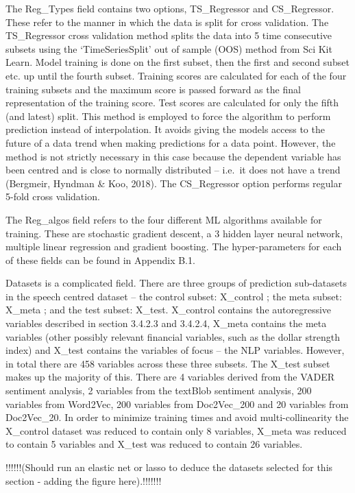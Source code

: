 \documentclass[11pt,preprint, authoryear]{elsarticle}
\numberwithin{equation}{section}
\numberwithin{figure}{section}
\numberwithin{table}{section}
\begin{document}
The Reg\_Types field contains two options, TS\_Regressor and
CS\_Regressor. These refer to the manner in which the data is split for
cross validation. The TS\_Regressor cross validation method splits the
data into 5 time consecutive subsets using the `TimeSeriesSplit' out of
sample (OOS) method from Sci Kit Learn. Model training is done on the
first subset, then the first and second subset etc. up until the fourth
subset. Training scores are calculated for each of the four training
subsets and the maximum score is passed forward as the final
representation of the training score. Test scores are calculated for
only the fifth (and latest) split. This method is employed to force the
algorithm to perform prediction instead of interpolation. It avoids
giving the models access to the future of a data trend when making
predictions for a data point. However, the method is not strictly
necessary in this case because the dependent variable has been centred
and is close to normally distributed -- i.e.~it does not have a trend
(Bergmeir, Hyndman \& Koo, 2018). The CS\_Regressor option performs
regular 5-fold cross validation.

The Reg\_algos field refers to the four different ML algorithms
available for training. These are stochastic gradient descent, a 3
hidden layer neural network, multiple linear regression and gradient
boosting. The hyper-parameters for each of these fields can be found in
Appendix B.1.

Datasets is a complicated field. There are three groups of prediction
sub-datasets in the speech centred dataset -- the control subset:
X\_control ; the meta subset: X\_meta ; and the test subset: X\_test.
X\_control contains the autoregressive variables described in section
3.4.2.3 and 3.4.2.4, X\_meta contains the meta variables (other possibly
relevant financial variables, such as the dollar strength index) and
X\_test contains the variables of focus -- the NLP variables. However,
in total there are 458 variables across these three subsets. The X\_test
subset makes up the majority of this. There are 4 variables derived from
the VADER sentiment analysis, 2 variables from the textBlob sentiment
analysis, 200 variables from Word2Vec, 200 variables from Doc2Vec\_200
and 20 variables from Doc2Vec\_20. In order to minimize training times
and avoid multi-collinearity the X\_control dataset was reduced to
contain only 8 variables, X\_meta was reduced to contain 5 variables and
X\_test was reduced to contain 26 variables.

!!!!!!(Should run an elastic net or lasso to deduce the datasets
selected for this section - adding the figure here).!!!!!!!
\end{document}
